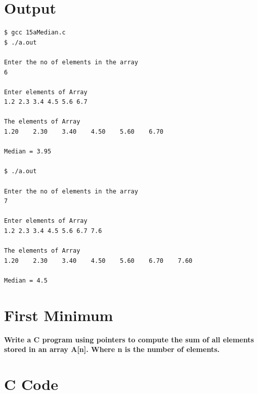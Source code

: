 \documentclass[a4paper]{report}
\begin{document}
\section*{Output}
\begin{Verbatim}
$ gcc 15aMedian.c 
$ ./a.out 

Enter the no of elements in the array
6

Enter elements of Array
1.2 2.3 3.4 4.5 5.6 6.7

The elements of Array
1.20 	2.30 	3.40 	4.50 	5.60 	6.70 	

Median = 3.95

$ ./a.out 

Enter the no of elements in the array
7

Enter elements of Array
1.2 2.3 3.4 4.5 5.6 6.7 7.6

The elements of Array
1.20 	2.30 	3.40 	4.50 	5.60 	6.70 	7.60 	

Median = 4.5

\end{Verbatim}
\pagebreak
\section{First Minimum}
{\selectfont \textbf{Write a C program using pointers to compute the sum of all elements stored in an array A[n]. Where n is the number of elements.
}}

\section*{C Code}
\end{document}
